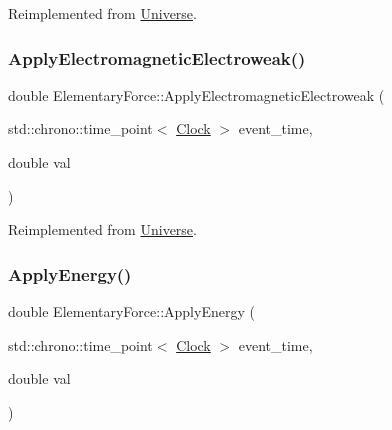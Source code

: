 Reimplemented from \mbox{\hyperlink{classUniverse_a1f787da78fa196ba635db21a9e91dabb}{Universe}}.

\mbox{\label{classElementaryForce_a3764a27b11760b6ead2c8a23ff25d77a}} 
\subsubsection{\texorpdfstring{Apply\+Electromagnetic\+Electroweak()}{ApplyElectromagneticElectroweak()}}
{\footnotesize\ttfamily double Elementary\+Force\+::\+Apply\+Electromagnetic\+Electroweak (\begin{DoxyParamCaption}\item[{std\+::chrono\+::time\+\_\+point$<$ \mbox{\hyperlink{universe_8h_a0ef8d951d1ca5ab3cfaf7ab4c7a6fd80}{Clock}} $>$}]{event\+\_\+time,  }\item[{double}]{val }\end{DoxyParamCaption})\hspace{0.3cm}{\ttfamily [virtual]}}



Reimplemented from \mbox{\hyperlink{classUniverse_a4c36c1ab30db993307f88363dde5e8c5}{Universe}}.

\mbox{\label{classElementaryForce_a0961328b260cb4dfb2ba54f4e284f0e8}} 
\subsubsection{\texorpdfstring{Apply\+Energy()}{ApplyEnergy()}}
{\footnotesize\ttfamily double Elementary\+Force\+::\+Apply\+Energy (\begin{DoxyParamCaption}\item[{std\+::chrono\+::time\+\_\+point$<$ \mbox{\hyperlink{universe_8h_a0ef8d951d1ca5ab3cfaf7ab4c7a6fd80}{Clock}} $>$}]{event\+\_\+time,  }\item[{double}]{val }\end{DoxyParamCaption})}

\mbox{\label{classElementaryForce_a655a2c9489bfbbf15e05ba4953628134}} 
